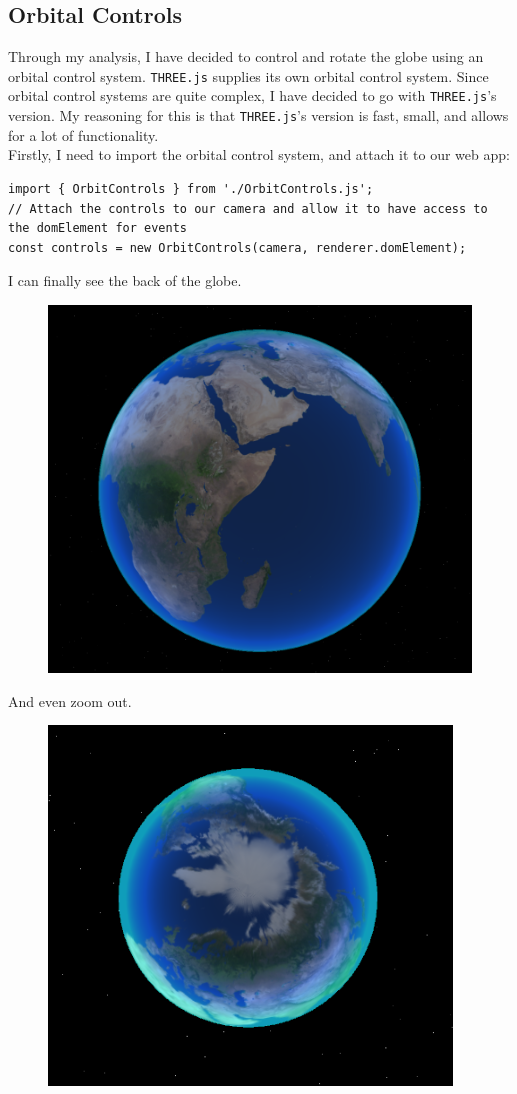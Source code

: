 \subsection{Orbital Controls}
Through my analysis, I have decided to control and rotate the globe using an orbital control system. \verb|THREE.js| supplies its own orbital control system. Since orbital control systems are quite complex, I have decided to go with \verb|THREE.js|'s version. My reasoning for this is that \verb|THREE.js|'s version is fast, small, and allows for a lot of functionality. \\
Firstly, I need to import the orbital control system, and attach it to our web app:
\begin{lstlisting}
import { OrbitControls } from './OrbitControls.js';
// Attach the controls to our camera and allow it to have access to the domElement for events
const controls = new OrbitControls(camera, renderer.domElement);
\end{lstlisting}
I can finally see the back of the globe.
\begin{figure}[h]
\centering
\includegraphics[width=0.3\linewidth]{images/back}
\caption{}
\label{fig:back}
\end{figure}
And even zoom out.
\begin{figure}[h]
\centering
\includegraphics[width=0.3\linewidth]{images/zoom}
\caption{}
\label{fig:zoom}
\end{figure}

\newpage

